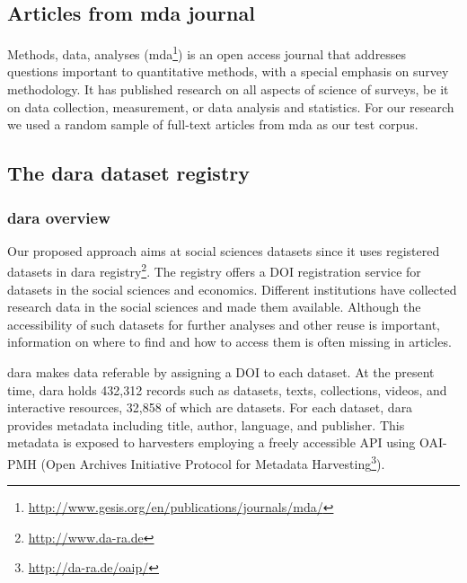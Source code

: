 \documentclass{IOS-Book-Article}
\newcommand{\dara}{\textsf{da\textbar ra}}
\begin{document}
 \subsection{Articles from mda journal}\label{sec:mda}
 
 Methods, data, analyses (mda\footnote{\url{http://www.gesis.org/en/publications/journals/mda/}}) is an open access journal that addresses questions important to quantitative methods, with a special emphasis on survey methodology.
 It has published research on all aspects of science of surveys, be it on data collection, measurement, or data analysis and statistics.
 For our research we used a random sample of full-text articles from mda as our test corpus.
  \subsection{The {\dara} dataset registry}
  
  \subsubsection{{\dara} overview}
  Our proposed approach aims at social sciences datasets since it uses registered datasets in {\dara} registry\footnote{\url{http://www.da-ra.de}}.
  The registry offers a DOI registration service for datasets in the social sciences and economics. 
  Different institutions have collected research data in the social sciences and made them available.
  Although the accessibility of such datasets for further analyses and other reuse is important, information on where to find and how to access them is often missing in articles.
  
{\dara} makes 
data referable 
by assigning a DOI to each dataset.
At the present time, {\dara} holds 432,312 records such as datasets, texts, collections, videos, and interactive resources, 32,858 of which are datasets. 
For each dataset, {\dara} provides metadata including title, author, language, and publisher.
This metadata is exposed to harvesters employing a freely accessible API using OAI-PMH (Open Archives Initiative Protocol for Metadata Harvesting\footnote{\url{http://da-ra.de/oaip/}}). 
  
\end{document}

